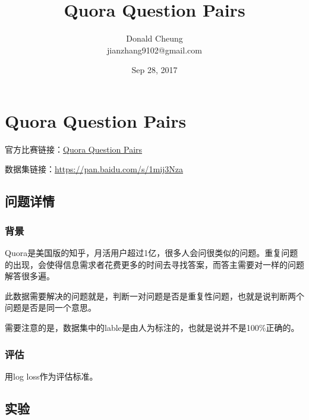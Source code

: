 \documentclass[10pt,a4paper]{ctexbook}
\begin{document}
    \setlength{\baselineskip}{20pt}
    \title{Quora Question Pairs}
    \author{Donald Cheung\\jianzhang9102@gmail.com}
    \date{Sep 28, 2017}
    \tableofcontents
\fi

\chapter{Quora Question Pairs}
官方比赛链接：\href{https://www.kaggle.com/c/quora-question-pairs}{Quora Question Pairs}

数据集链接：\url{https://pan.baidu.com/s/1mij3Nza}

\section{问题详情}

\subsection{背景}
Quora是美国版的知乎，月活用户超过1亿，很多人会问很类似的问题。重复问题的出现，会使得信息需求者花费更多的时间去寻找答案，而答主需要对一样的问题解答很多遍。

此数据需要解决的问题就是，判断一对问题是否是重复性问题，也就是说判断两个问题是否是同一个意思。

需要注意的是，数据集中的lable是由人为标注的，也就是说并不是100\%正确的。

\subsection{评估}
用log loss作为评估标准。

\section{实验}
\end{document}
